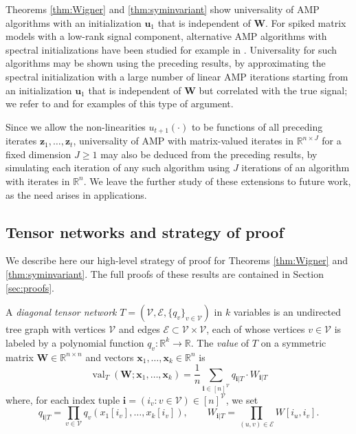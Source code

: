 \documentclass[10pt,reqno]{amsart}
\def\x{\mathbf{x}}
\def\z{\mathbf{z}}
\def\W{\mathbf{W}}
\def\R{\mathbb{R}}
\def\cV{\mathcal{V}}
\def\cE{\mathcal{E}}
\def\val{\operatorname{val}}
\def\bW{{\mathbf{W}}}
\def\bi{\mathbf{i}}
\def\bu{{\mathbf{u}}}
\begin{document}
\begin{remark}
Theorems \ref{thm:Wigner} and \ref{thm:syminvariant} show universality
of AMP algorithms with an initialization $\bu_1$ that is independent of $\bW$.
For spiked matrix models with a low-rank signal component, alternative
AMP algorithms with spectral initializations have been studied for example in
\cite{montanari2021estimation,mondelli2021pca,zhong2021approximate}. Universality for such
algorithms may be shown using the preceding results, by approximating the
spectral initialization with a large number of linear AMP iterations starting
from an initialization $\bu_1$ that is independent of $\bW$ but
correlated with the true signal; we refer
to \cite[Section 8]{chen2021universality} and \cite[Section
A.2]{zhong2021approximate} for examples of this type of argument.

Since we allow the non-linearities $u_{t+1}(\cdot)$ to be functions of
all preceding iterates $\z_1,\ldots,\z_t$,
universality of AMP with matrix-valued iterates in $\R^{n \times J}$ for a
fixed dimension $J \geq 1$ may also be
deduced from the preceding results, by simulating each iteration of
any such algorithm using $J$ iterations of an algorithm with iterates
in $\R^n$. We leave the further study of these extensions to future work,
as the need arises in applications.
\end{remark}

\subsection{Tensor networks and strategy of proof}

We describe here our high-level strategy of proof for
Theorems \ref{thm:Wigner} and \ref{thm:syminvariant}.
The full proofs of these results are contained in Section \ref{sec:proofs}.

\begin{definition}\label{def:tensornetwork}
A \emph{diagonal tensor network} $T=(\cV,\cE,\{q_v\}_{v \in \cV})$ in $k$
variables is an undirected tree graph with vertices $\cV$ and edges
$\cE \subset \cV \times \cV$, each of whose vertices $v \in \cV$ is labeled by
a polynomial function $q_v:\R^k \to \R$.
The \emph{value} of $T$ on a symmetric matrix
$\W \in \R^{n \times n}$ and vectors $\x_1,\ldots,\x_k \in \R^n$ is
\[\val_T(\W;\x_1,\ldots,\x_k)=\frac{1}{n} \sum_{\bi \in [n]^\cV}
q_{\bi|T} \cdot W_{\bi|T}\]
where, for each index tuple $\bi=(i_v:v \in \cV) \in [n]^\cV$, we set
\[q_{\bi|T}=\prod_{v \in \cV} q_v(x_1[i_v],\ldots,x_k[i_v]),
\qquad W_{\bi|T}=\prod_{(u,v) \in \cE} W[i_u,i_v].\]
\end{definition}
\end{document}
